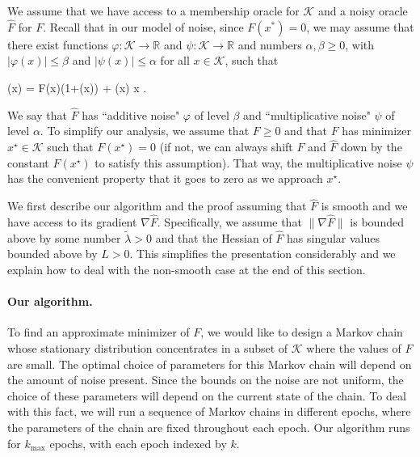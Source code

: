 \documentclass[final,12pt]{colt2018} %
\def \be{\begin{equs}}
\def \ee{\end{equs}}
\begin{document}
{We assume that we have access to a membership oracle for $\mathcal{K}$ and a noisy oracle $\hat{F}$ for $F$.
%
Recall that in our model of noise, {since $F(x^{*}) = 0$, we may} assume that there exist functions $\varphi:\mathcal{K} \rightarrow \mathbb{R}$ and $\psi:\mathcal{K} \rightarrow \mathbb{R}$ and numbers $\alpha, \beta \geq 0$, with $|\varphi(x)|\leq\beta$ and $|\psi(x)|\leq\alpha$ for all $x\in \mathcal{K}$, such that
%
\be \label{eq:noise_model}
(x) = F(x)(1+\psi(x)) + \varphi(x) \quad \quad \forall x \in {}.
\ee
%
We say that $\hat{F}$ has ``additive noise" $\varphi$ of level $\beta$ and ``multiplicative noise" $\psi$ of level $\alpha$.  
%
To simplify our analysis, we assume that $F\geq 0$ and that $F$ has minimizer $x^\star \in \mathcal{K}$ such that $F(x^\star)= 0$ (if not, we can always shift $F$ and $\hat{F}$ down by the constant $F(x^\star)$ to satisfy this assumption).  
%
That way, the multiplicative noise $\psi$ has the convenient property that it goes to zero as we approach $x^\star$.
%

We first describe our algorithm and the proof assuming that $\hat{F}$ is smooth and we have access to its gradient $\nabla \hat{F}$. 
%
Specifically, we assume that $\|\nabla \hat{F}\|$ is bounded above by some number $\tilde{\lambda}>0$ and that the Hessian of $\hat{F}$ has singular values bounded above by $L>0$.
%
This simplifies the presentation considerably and we explain how to deal with the non-smooth case at the end of this section.  


\paragraph{Our algorithm.}
To find an approximate minimizer of $F$, we would like to design a Markov chain whose stationary distribution concentrates in a subset of $\mathcal{K}$ where the values of $F$ are small.
%
The optimal choice of parameters for this Markov chain will depend on the amount of noise present.
%
Since the bounds on the noise are not uniform, the choice of these parameters will depend on the current state of the chain. 
%
To deal with this fact, we will run a sequence of Markov chains in different epochs, where the parameters of the chain are fixed throughout each epoch.
%
Our algorithm runs for $k_{\textrm{max}}$ epochs, with each epoch indexed by $k$.
%


}
\end{document}
